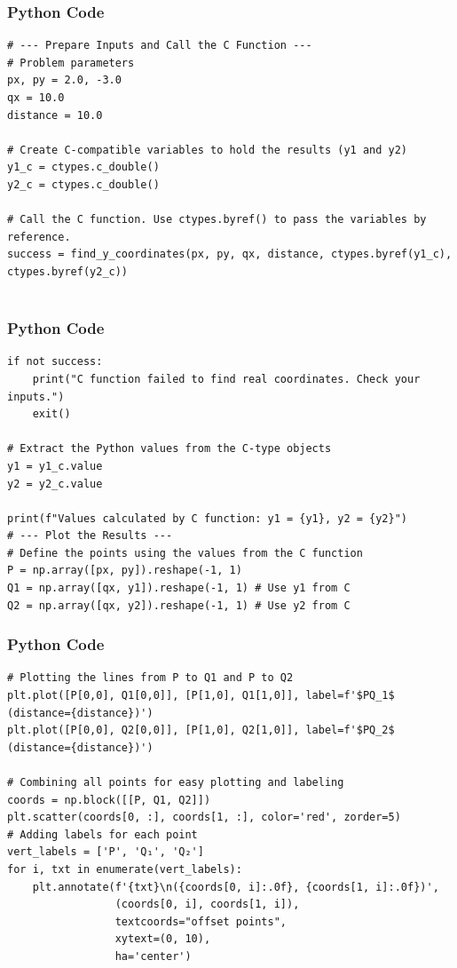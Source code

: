 \documentclass{beamer}
\begin{document}
\begin{frame}[fragile]
    \frametitle{Python Code}
    \begin{lstlisting}
# --- Prepare Inputs and Call the C Function ---
# Problem parameters
px, py = 2.0, -3.0
qx = 10.0
distance = 10.0

# Create C-compatible variables to hold the results (y1 and y2)
y1_c = ctypes.c_double()
y2_c = ctypes.c_double()

# Call the C function. Use ctypes.byref() to pass the variables by reference.
success = find_y_coordinates(px, py, qx, distance, ctypes.byref(y1_c), ctypes.byref(y2_c))


    \end{lstlisting}
\end{frame}

\begin{frame}[fragile]
    \frametitle{Python Code}
    \begin{lstlisting}
if not success:
    print("C function failed to find real coordinates. Check your inputs.")
    exit()

# Extract the Python values from the C-type objects
y1 = y1_c.value
y2 = y2_c.value

print(f"Values calculated by C function: y1 = {y1}, y2 = {y2}")
# --- Plot the Results ---
# Define the points using the values from the C function
P = np.array([px, py]).reshape(-1, 1)
Q1 = np.array([qx, y1]).reshape(-1, 1) # Use y1 from C
Q2 = np.array([qx, y2]).reshape(-1, 1) # Use y2 from C

    \end{lstlisting}
\end{frame}
\begin{frame}[fragile]
    \frametitle{Python Code}
    \begin{lstlisting}
# Plotting the lines from P to Q1 and P to Q2
plt.plot([P[0,0], Q1[0,0]], [P[1,0], Q1[1,0]], label=f'$PQ_1$ (distance={distance})')
plt.plot([P[0,0], Q2[0,0]], [P[1,0], Q2[1,0]], label=f'$PQ_2$ (distance={distance})')

# Combining all points for easy plotting and labeling
coords = np.block([[P, Q1, Q2]])
plt.scatter(coords[0, :], coords[1, :], color='red', zorder=5)
# Adding labels for each point
vert_labels = ['P', 'Q₁', 'Q₂']
for i, txt in enumerate(vert_labels):
    plt.annotate(f'{txt}\n({coords[0, i]:.0f}, {coords[1, i]:.0f})',
                 (coords[0, i], coords[1, i]),
                 textcoords="offset points",
                 xytext=(0, 10),
                 ha='center')
    \end{lstlisting}
\end{frame}
\end{document}
